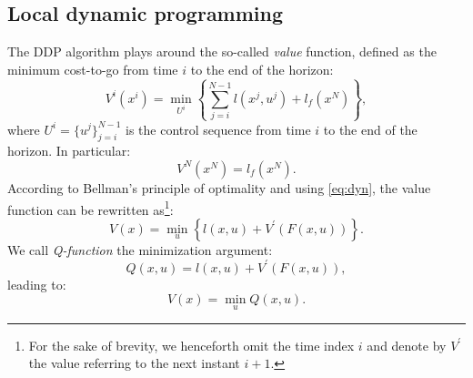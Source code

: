 \subsection{Local dynamic programming}
The DDP algorithm plays around the so-called \textit{value} function, defined as the minimum cost-to-go from time $i$ to the end of the horizon:
\begin{equation*}
    V^i(x^i) = \min_{U^i} \left\{ \sum_{j=i}^{N-1} l(x^j, u^j) + l_f(x^N) \right\},
\end{equation*}
where $U^i = \{u^j\}_{j=i}^{N-1}$ is the control sequence from time $i$ to the end of the horizon. In particular:
\begin{equation}
    V^N(x^N) = l_f(x^N). \label{eq:vf_N}
\end{equation}
According to Bellman's principle of optimality \cite{bellman} and using \ref{eq:dyn}, the value function can be rewritten as\footnote{For the sake of brevity, we henceforth omit the time index $i$ and denote by $V^\prime$ the value referring to the next instant $i+1$.}:
\begin{equation*}
    V(x) = \min_{u} \left\{ l(x, u) + V^\prime(F(x, u)) \right\}.
\end{equation*}
We call \textit{Q-function} the minimization argument:
\begin{equation}
    Q(x, u) = l(x, u) + V^\prime(F(x, u)), \label{eq:qfun}
\end{equation}
leading to:
\begin{equation}
    V(x) = \min_{u} Q(x, u). \label{eq:vfun}
\end{equation}

